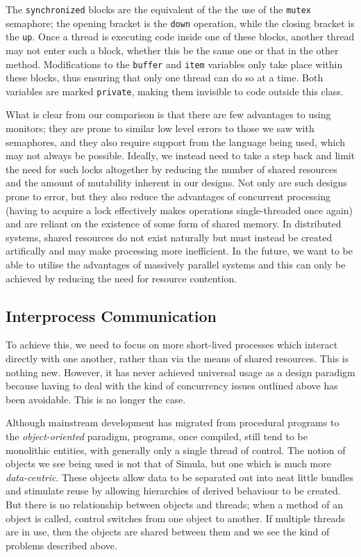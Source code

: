The \texttt{synchronized} blocks are the equivalent of the the use of
the \texttt{mutex} semaphore; the opening bracket is the \texttt{down}
operation, while the closing bracket is the \texttt{up}.  Once a
thread is executing code inside one of these blocks, another thread
may not enter such a block, whether this be the same one or that in
the other method.  Modifications to the \texttt{buffer} and
\texttt{item} variables only take place within these blocks, thus
ensuring that only one thread can do so at a time.  Both variables are
marked \texttt{private}, making them invisible to code outside this
class.

What is clear from our comparison is that there are few advantages to
using monitors; they are prone to similar low level errors to those we
saw with semaphores, and they also require support from the language
being used, which may not always be possible.  Ideally, we instead
need to take a step back and limit the need for such locks altogether
by reducing the number of shared resources and the amount of
mutability inherent in our designs.  Not only are such designs prone
to error, but they also reduce the advantages of concurrent processing
(having to acquire a lock effectively makes operations single-threaded
once again) and are reliant on the existence of some form of shared
memory.  In distributed systems, shared resources do not exist
naturally but must instead be created artifically and may make
processing more inefficient.  In the future, we want to be able to
utilise the advantages of massively parallel systems and this can only
be achieved by reducing the need for resource contention.

\subsection{Interprocess Communication}

To achieve this, we need to focus on more short-lived processes which
interact directly with one another, rather than via the means of
shared resources.  This is nothing new.  However, it has never
achieved universal usage as a design paradigm because having to deal
with the kind of concurrency issues outlined above has been avoidable.
This is no longer the case.

Although mainstream development has migrated from procedural programs
to the \emph{object-oriented} paradigm, programs, once compiled, still
tend to be monolithic entities, with generally only a single thread of
control.  The notion of objects we see being used is not that of
Simula\cite{simula}, but one which is much more \emph{data-centric}.
These objects allow data to be separated out into neat little bundles
and stimulate reuse by allowing hierarchies of derived behaviour to be
created.  But there is no relationship between objects and threads;
when a method of an object is called, control switches from one object
to another.  If multiple threads are in use, then the objects are
shared between them and we see the kind of problems described above.

